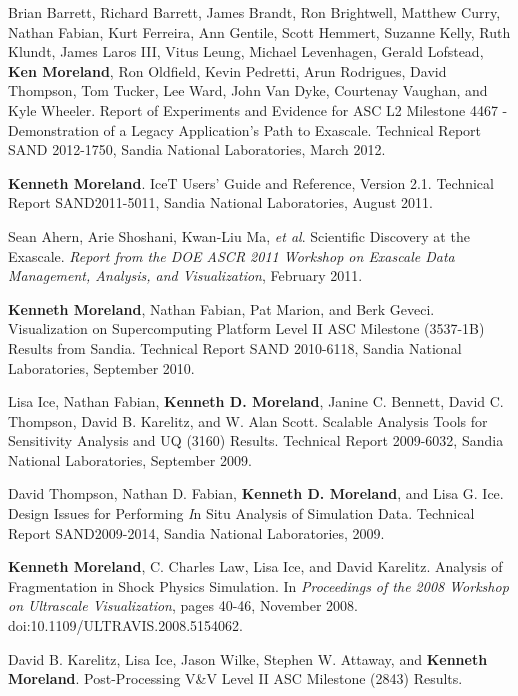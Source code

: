 \begin{enumerate}[label={[\arabic*]}, left=0pt]
  Brian Barrett, Richard Barrett, James Brandt, Ron Brightwell, Matthew Curry, Nathan Fabian, Kurt Ferreira, Ann Gentile, Scott Hemmert, Suzanne Kelly, Ruth Klundt, James Laros III, Vitus Leung, Michael Levenhagen, Gerald Lofstead, \textbf{Ken Moreland}, Ron Oldfield, Kevin Pedretti, Arun Rodrigues, David Thompson, Tom Tucker, Lee Ward, John Van Dyke, Courtenay Vaughan, and Kyle Wheeler.
  Report of Experiments and Evidence for ASC L2 Milestone 4467 - Demonstration of a Legacy Application’s Path to Exascale.
Technical Report SAND 2012-1750, Sandia National Laboratories, March 2012.
\item  %
  \textbf{Kenneth Moreland}.
  {IceT} Users' Guide and Reference, Version 2.1.
Technical Report SAND2011-5011, Sandia National Laboratories, August 2011.
\item  %
  Sean Ahern, Arie Shoshani, Kwan-Liu Ma, \emph{et al}.
  Scientific Discovery at the Exascale.
\emph{Report from the DOE ASCR 2011 Workshop on Exascale Data Management, Analysis, and Visualization}, February 2011.
\item  %
  \textbf{Kenneth Moreland}, Nathan Fabian, Pat Marion, and Berk Geveci.
  Visualization on Supercomputing Platform Level {II} {ASC} Milestone {(3537-1B)} Results from {Sandia}.
Technical Report SAND 2010-6118, Sandia National Laboratories, September 2010.
\item  %
  Lisa Ice, Nathan Fabian, \textbf{Kenneth D. Moreland}, Janine C. Bennett, David C. Thompson, David B. Karelitz, and W. Alan Scott.
  Scalable Analysis Tools for Sensitivity Analysis and {UQ} (3160) Results.
Technical Report 2009-6032, Sandia National Laboratories, September 2009.
\item  %
  David Thompson, Nathan D. Fabian, \textbf{Kenneth D. Moreland}, and Lisa G. Ice.
  Design Issues for Performing {\textit In Situ} Analysis of Simulation Data.
Technical Report SAND2009-2014, Sandia National Laboratories, 2009.
\item  %
  \textbf{Kenneth Moreland}, C. Charles Law, Lisa Ice, and David Karelitz.
  Analysis of Fragmentation in Shock Physics Simulation.
  In \emph{Proceedings of the 2008 Workshop on Ultrascale Visualization}, pages 40-46, November 2008.
  doi:10.1109/ULTRAVIS.2008.5154062.
\item  %
  David B. Karelitz, Lisa Ice, Jason Wilke, Stephen W. Attaway, and \textbf{Kenneth Moreland}.
  Post-Processing {V\&V} Level {II} {ASC} Milestone (2843) Results.

\end{enumerate}
